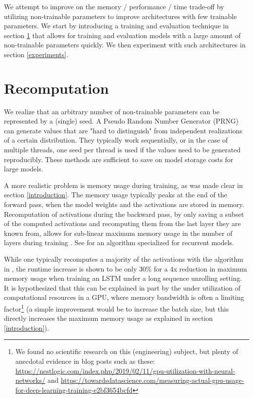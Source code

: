 \documentclass[]{article}
\begin{document}
\begin{multicols}{2}
	We attempt to improve on the memory / performance / time trade-off by utilizing non-trainable parameters to improve architectures with few trainable parameters. We start by introducing a training and evaluation technique in section \ref{recomputation} that allows for training and evaluation models with a large amount of non-trainable parameters quickly. We then experiment with such architectures in section \ref{experiments}.
	
	\section{Recomputation}\label{recomputation}
	We realize that an arbitrary number of non-trainable parameters can be represented by a (single) seed. A Pseudo Random Number Generator (PRNG) can generate values that are "hard to distinguish" from independent realizations of a certain distribution. They typically work sequentially, or in the case of multiple threads, one seed per thread is used if the values need to be generated reproducibly. These methods are sufficient to save on model storage costs for large models.
	
	A more realistic problem is memory usage during training, as was made clear in section \ref{introduction}. The memory usage typically peaks at the end of the forward pass, when the model weights and the activations are stored in memory. Recomputation of activations during the backward pass, by only saving a subset of the computed activations and recomputing them from the last layer they are known from, allows for sub-linear maximum memory usage in the number of layers during training \cite{chen2016training}. See \cite{DBLP:journals/corr/GruslysMDLG16} for an algorithm specialized for recurrent models.
	
	While one typically recomputes a majority of the activations with the algorithm in \cite{chen2016training}, the runtime increase is shown to be only 30\% for a 4x reduction in maximum memory usage when training an LSTM under a long sequence unrolling setting. It is hypothesized that this can be explained in part by the under utilization of computational resources in a GPU, where memory bandwidth is often a limiting factor\footnote{We found no scientific research on this (engineering) subject, but plenty of anecdotal evidence in blog posts such as these: \url{https://nestlogic.com/index.php/2019/02/11/gpu-utilization-with-neural-networks/} and  \url{https://towardsdatascience.com/measuring-actual-gpu-usage-for-deep-learning-training-e2bf3654bcfd}} (a simple improvement would be to increase the batch size, but this directly increases the maximum memory usage as explained in section \ref{introduction}).
	

\end{multicols}
\end{document}
